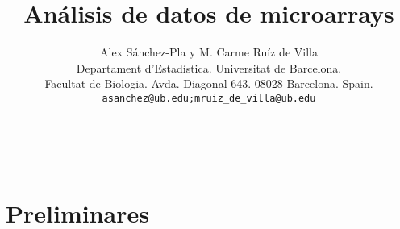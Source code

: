 \documentclass{uoc-es}[2008/10/15 v2.1 UOC document class]%
\title{An\'alisis de datos de microarrays} %
\author{Alex S\'anchez-Pla y M. Carme Ru\'iz de Villa\\
Departament d'Estad\'istica. Universitat de Barcelona.\\
Facultat de Biologia. Avda. Diagonal 643. 08028 Barcelona. Spain.\\
\texttt{asanchez@ub.edu;mruiz\_de\_villa@ub.edu}}
\begin{document}
\maketitle

\newpage
\mbox{ }
\thispagestyle{empty}
\newpage

\tableofcontents


\setcounter{modul}{1}
\normalbaroutside %
\frenchspacing

\part{Preliminares}













%

\end{document}
